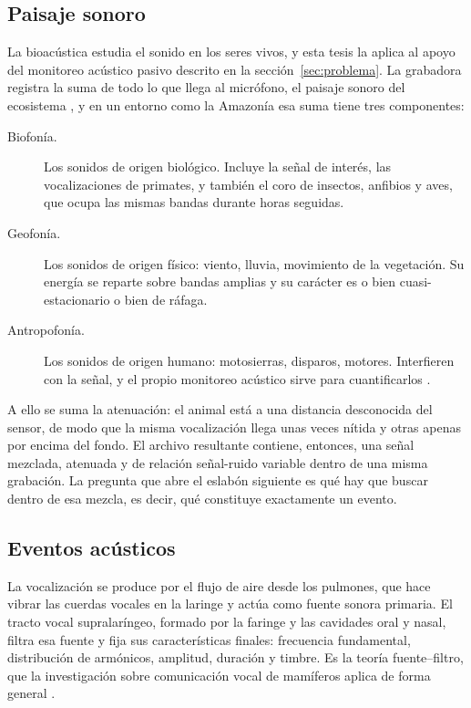 \subsection{Paisaje sonoro}

La bioacústica estudia el sonido en los seres vivos, y esta tesis la aplica al
apoyo del monitoreo acústico pasivo descrito en la sección~\ref{sec:problema}. La
grabadora registra la suma de todo lo que llega al micrófono, el paisaje sonoro del ecosistema \citep{blumstein_acoustic_2011}, y
en un entorno como la Amazonía esa suma tiene tres componentes:

\begin{description}
    \item[Biofonía.] Los sonidos de origen biológico. Incluye la señal de interés,
          las vocalizaciones de primates, y también el coro de insectos, anfibios
          y aves, que ocupa las mismas bandas durante horas seguidas.

    \item[Geofonía.] Los sonidos de origen físico: viento, lluvia, movimiento de
          la vegetación. Su energía se reparte sobre bandas amplias y su carácter es
          o bien cuasi-estacionario o bien de ráfaga.

    \item[Antropofonía.] Los sonidos de origen humano: motosierras, disparos,
          motores. Interfieren con la señal, y el propio monitoreo acústico
          sirve para cuantificarlos \citep{blumstein_acoustic_2011}.
\end{description}

A ello se suma la atenuación: el animal está a una distancia desconocida del
sensor, de modo que la misma vocalización llega unas veces nítida y otras apenas
por encima del fondo. El archivo resultante contiene, entonces, una señal
mezclada, atenuada y de relación señal-ruido variable dentro de una misma
grabación. La pregunta que abre el eslabón siguiente es qué hay que buscar dentro
de esa mezcla, es decir, qué constituye exactamente un evento.

\subsection{Eventos acústicos}

La vocalización se produce por el flujo de aire desde los pulmones, que hace
vibrar las cuerdas vocales en la laringe y actúa como fuente sonora primaria. El
tracto vocal supralaríngeo, formado por la faringe y las cavidades oral y nasal,
filtra esa fuente y fija sus características finales: frecuencia fundamental,
distribución de armónicos, amplitud, duración y timbre. Es la teoría
fuente--filtro, que la investigación sobre comunicación vocal de mamíferos aplica
de forma general \citep{taylor_contribution_2010}.

